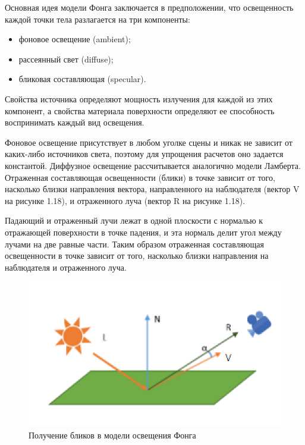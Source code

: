 \documentclass[12pt,a4paper,oneside]{report}
\begin{document}
	 \quad Основная идея модели Фонга заключается в предположении, что освещенность каждой точки тела разлагается на три компоненты:
	\begin{itemize}
		\item фоновое освещение (ambient);
		\item рассеянный свет (diffuse);
		\item бликовая составляющая (specular).
	\end{itemize}

	 Свойства источника определяют мощность излучения для каждой из этих компонент, а свойства материала поверхности определяют ее способность воспринимать каждый вид освещения.
	
	 Фоновое освещение присутствует в любом уголке сцены и никак не зависит от каких-либо источников света, поэтому для упрощения расчетов оно задается константой. Диффузное освещение рассчитывается аналогично модели Ламберта. Отраженная составляющая освещенности (блики) в точке зависит от того, насколько близки направления вектора, направленного на наблюдателя (вектор V на рисунке 1.18), и отраженного луча (вектор R на рисунке 1.18).
	
	 Падающий и отраженный лучи лежат в одной плоскости с нормалью к отражающей поверхности в точке падения, и эта нормаль делит угол между лучами на две равные части. Таким образом отраженная составляющая освещенности в точке зависит от того, насколько близки направления на наблюдателя и отраженного луча.
	
	\begin{figure}[h]
		\centering
		\includegraphics[width=0.7\linewidth]{ph}
		\caption{Получение бликов в модели освещения Фонга}
		\label{fig:screenshot003}
	\end{figure}
\end{document}
